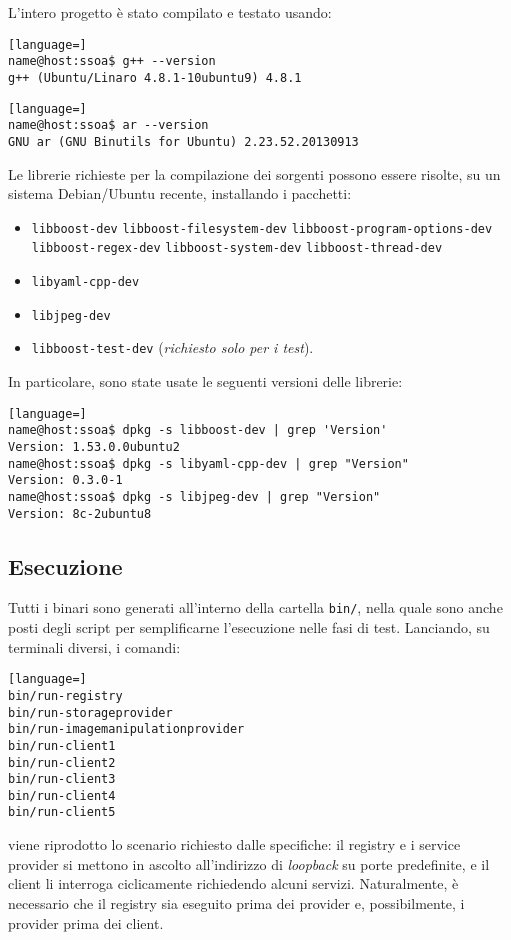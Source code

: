 \documentclass[a4paper,twoside]{article}
\newcommand*\file{\texttt}
\begin{document}
L'intero progetto è stato compilato e testato usando:
\begin{lstlisting}[language=]
name@host:ssoa$ g++ --version 
g++ (Ubuntu/Linaro 4.8.1-10ubuntu9) 4.8.1
\end{lstlisting}

\begin{lstlisting}[language=]
name@host:ssoa$ ar --version 
GNU ar (GNU Binutils for Ubuntu) 2.23.52.20130913
\end{lstlisting}

Le librerie richieste per la compilazione dei sorgenti possono essere risolte, su un sistema Debian/Ubuntu recente, installando i pacchetti:
\begin{itemize}
\item \file{libboost-dev} \file{libboost-filesystem-dev} \file{libboost-program-options-dev} \file{libboost-regex-dev} \file{libboost-system-dev} \file{libboost-thread-dev}
\item \file{libyaml-cpp-dev}
\item \file{libjpeg-dev}
\item \file{libboost-test-dev} (\emph{richiesto solo per i test}).
\end{itemize}

In particolare, sono state usate le seguenti versioni delle librerie:
\begin{lstlisting}[language=]
name@host:ssoa$ dpkg -s libboost-dev | grep 'Version'
Version: 1.53.0.0ubuntu2
name@host:ssoa$ dpkg -s libyaml-cpp-dev | grep "Version"
Version: 0.3.0-1
name@host:ssoa$ dpkg -s libjpeg-dev | grep "Version"
Version: 8c-2ubuntu8
\end{lstlisting}


\subsection{Esecuzione}

Tutti i binari sono generati all'interno della cartella \file{bin/}, nella quale sono anche posti degli script per semplificarne l'esecuzione nelle fasi di test. Lanciando, su terminali diversi, i comandi:
\begin{lstlisting}[language=]
bin/run-registry
bin/run-storageprovider
bin/run-imagemanipulationprovider
bin/run-client1
bin/run-client2
bin/run-client3
bin/run-client4
bin/run-client5
\end{lstlisting}
viene riprodotto lo scenario richiesto dalle specifiche: il registry e i service provider si mettono in ascolto all'indirizzo di \emph{loopback} su porte predefinite, e il client li interroga ciclicamente richiedendo alcuni servizi. Naturalmente, è necessario che il registry sia eseguito prima dei provider e, possibilmente, i provider prima dei client.
\end{document}
